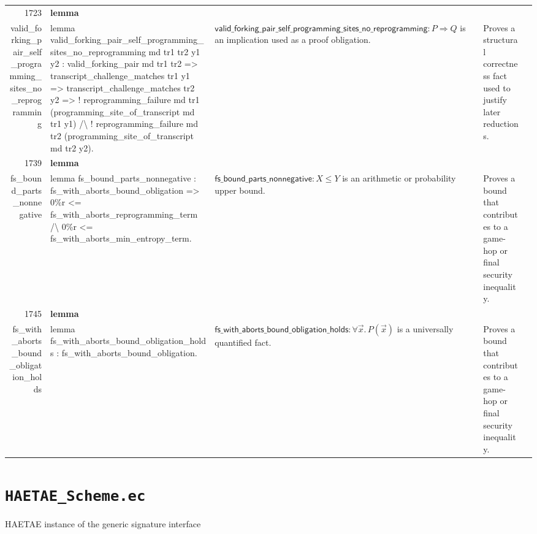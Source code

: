 \documentclass[10pt]{article}
\newcommand{\ec}[1]{\begingroup\ttfamily\scriptsize #1\endgroup}
\begin{document}
\begin{longtable}{r L{0.17\textwidth} L{0.26\textwidth} L{0.27\textwidth} L{0.20\textwidth}}
1723 & \textbf{lemma}\\\ec{valid\_forking\_pair\_self\_programming\_sites\_no\_reprogramming} & \ec{lemma valid\_forking\_pair\_self\_programming\_sites\_no\_reprogramming md tr1 tr2 y1 y2 : valid\_forking\_pair md tr1 tr2 => transcript\_challenge\_matches tr1 y1 => transcript\_challenge\_matches tr2 y2 => ! reprogramming\_failure md tr1 (programming\_site\_of\_transcript md tr1 y1) /\textbackslash{} ! reprogramming\_failure md tr2 (programming\_site\_of\_transcript md tr2 y2).} & \(\mathsf{valid\_forking\_pair\_self\_programming\_sites\_no\_reprogramming} : P \Rightarrow Q\) is an implication used as a proof obligation. & Proves a structural correctness fact used to justify later reductions. \\
1739 & \textbf{lemma}\\\ec{fs\_bound\_parts\_nonnegative} & \ec{lemma fs\_bound\_parts\_nonnegative : fs\_with\_aborts\_bound\_obligation => 0\%r <= fs\_with\_aborts\_reprogramming\_term /\textbackslash{} 0\%r <= fs\_with\_aborts\_min\_entropy\_term.} & \(\mathsf{fs\_bound\_parts\_nonnegative} : X \le Y\) is an arithmetic or probability upper bound. & Proves a bound that contributes to a game-hop or final security inequality. \\
1745 & \textbf{lemma}\\\ec{fs\_with\_aborts\_bound\_obligation\_holds} & \ec{lemma fs\_with\_aborts\_bound\_obligation\_holds : fs\_with\_aborts\_bound\_obligation.} & \(\mathsf{fs\_with\_aborts\_bound\_obligation\_holds} : \forall \vec{x}.\, P(\vec{x})\) is a universally quantified fact. & Proves a bound that contributes to a game-hop or final security inequality. \\
\bottomrule
\end{longtable}

\clearpage
\section{\texorpdfstring{\texttt{HAETAE\_Scheme.ec}}{HAETAE Scheme.ec}}
HAETAE instance of the generic signature interface
\end{document}
